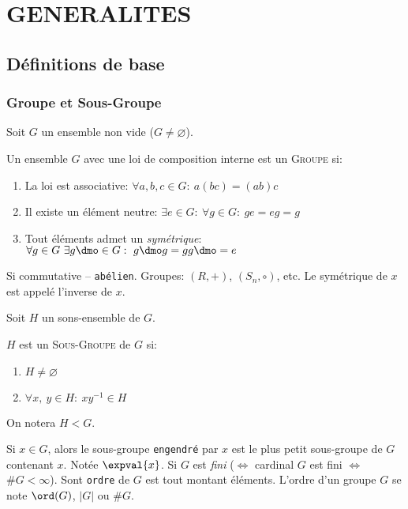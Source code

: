 \chapter{GENERALITES} %
\label{cha:generalites}

\section{Définitions de base}
\subsection{Groupe et Sous-Groupe} %
\label{sub:groupe_et_sous_groupe}

Soit $G$ un ensemble non vide ($G \neq\varnothing$).
\begin{definition}
	Un ensemble $G$ avec une loi de composition interne est un \textsc{Groupe} si:
	\begin{enumerate}
		\item La loi est associative: $\forall a,b,c\in G:\ a(bc)=(ab)c$ 
		\item Il existe un élément neutre: $\exists e\in G:\ \forall g\in G:\ ge=eg=g$
		\item Tout éléments admet un \emph{symétrique}: $\forall g\in G\ \exists g\dmo \in G:\ g\dmo g=gg\dmo=e$
	\end{enumerate}
\end{definition}

Si commutative -- \texttt{abélien}. Groupes: $(R, +)$, $(S_n, \circ)$, etc. Le symétrique de $x$ est appelé l'inverse de $x$.

Soit $H$ un sons-ensemble de $G$.
\begin{definition}
	$H$ est un \textsc{Sous-Groupe} de $G$ si:
	\begin{enumerate}
		\item $H \neq\varnothing$
		\item $\forall x,\ y \in H:\ xy^{-1}\in H$
	\end{enumerate}
	On notera $H < G$.
\end{definition}

Si $x\in G$, alors le sous-groupe \texttt{engendré} par $x$ est le plus petit sous-groupe de $G$ contenant $x$. Notée $\expval{x}$. Si $G$ est \emph{fini} ($\Leftrightarrow$ cardinal $G$ est fini $\Leftrightarrow$ $\#G<\infty$). Sont \texttt{ordre} de $G$ est tout montant éléments. L'ordre d'un groupe $G$ se note $\ord(G)$, $|G|$ ou $\#G$.

